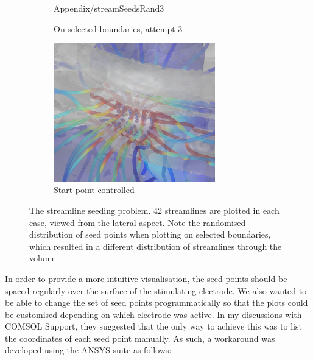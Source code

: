 \begin{appendices}
\begin{figure}
\begin{subfigure}[t]{0.5\textwidth}
        {Appendix/streamSeedsRand3}
        \caption{On selected boundaries, attempt 3}
        \label{fig:seeding_problem_rand3}
    \end{subfigure}%
    \begin{subfigure}[t]{0.5\textwidth}
        \centering
        \includegraphics[width=7cm,trim={2cm 2cm 3cm 4cm},clip]
        {Appendix/streamSeedsGrid}
        \caption{Start point controlled}
        \label{fig:seeding_problem_grid}
    \end{subfigure}
    
	\caption[The streamline seeding problem]{The streamline seeding problem. 42
	streamlines are plotted in each case, viewed from the lateral aspect. Note the
	randomised distribution of seed points when plotting on selected boundaries,
	which resulted in a different distribution of streamlines through the volume.}
	\label{fig:seeding_problem}
\end{figure}


In order to provide a more intuitive visualisation, the seed points should
be spaced regularly over the surface of the stimulating electrode. We also
wanted to be able to change the set of seed points programmatically so that the
plots could be customised depending on which electrode was active. In my
discussions with COMSOL Support, they suggested that the only way to achieve
this was to list the coordinates of each seed point manually. As such, a
workaround was developed using the ANSYS suite as follows:


\end{appendices}
